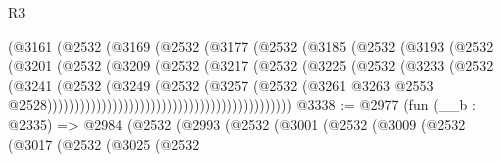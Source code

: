 \begin{lexlean}{R3}
\begin{coremodule}
                                        (@3161
                                          (@2532
                                            (@3169
                                              (@2532
                                                (@3177
                                                  (@2532
                                                    (@3185
                                                      (@2532
                                                        (@3193
                                                          (@2532
                                                            (@3201
                                                              (@2532
                                                                (@3209
                                                                  (@2532
                                                                    (@3217
                                                                      (@2532
                                                                        (@3225
                                                                          (@2532
                                                                            (@3233
                                                                              (@2532
                                                                                (@3241
                                                                                  (@2532
                                                                                    (@3249
                                                                                      (@2532
                                                                                        (@3257
                                                                                          (@2532
                                                                                            (@3261
                                                                                              @3263
                                                                                              @2553
                                                                                              @2528)))))))))))))))))))))))))))))))))))))))))))))
@3338 := @2977
    (fun (__b : @2335) =>
    @2984
      (@2532
        (@2993
          (@2532
            (@3001
              (@2532
                (@3009
                  (@2532
                    (@3017
                      (@2532
                        (@3025
                          (@2532

\end{coremodule}
\end{lexlean}
